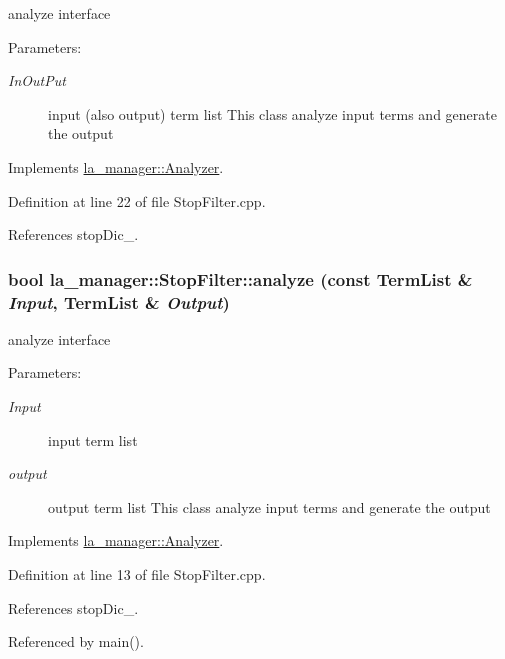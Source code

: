 analyze interface 

\begin{Desc}
\item[Parameters:]
\begin{description}
\item[{\em InOutPut}]input (also output) term list This class analyze input terms and generate the output \end{description}
\end{Desc}


Implements \hyperlink{classla__manager_1_1Analyzer_23414b773ec2070957e9aa3d6a7d8b78}{la\_\-manager::Analyzer}.

Definition at line 22 of file StopFilter.cpp.

References stopDic\_\-.\hypertarget{classla__manager_1_1StopFilter_455c6f7e8330c3684ffd548956fe7a16}{
\subsubsection[{analyze}]{\setlength{\rightskip}{0pt plus 5cm}bool la\_\-manager::StopFilter::analyze (const {\bf TermList} \& {\em Input}, \/  {\bf TermList} \& {\em Output})}}
\label{classla__manager_1_1StopFilter_455c6f7e8330c3684ffd548956fe7a16}


analyze interface 

\begin{Desc}
\item[Parameters:]
\begin{description}
\item[{\em Input}]input term list \item[{\em output}]output term list This class analyze input terms and generate the output \end{description}
\end{Desc}


Implements \hyperlink{classla__manager_1_1Analyzer_a096ba4b2faeaa0f3938d7b826ab1c78}{la\_\-manager::Analyzer}.

Definition at line 13 of file StopFilter.cpp.

References stopDic\_\-.

Referenced by main().

